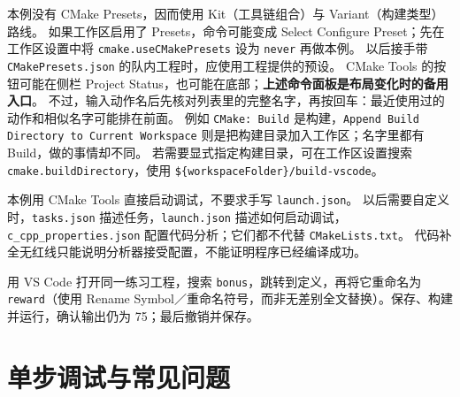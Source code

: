 本例没有 CMake Presets，因而使用 Kit（工具链组合）与 Variant（构建类型）路线。
如果工作区启用了 Presets，命令可能变成 Select Configure Preset；先在工作区设置中将 \texttt{cmake.useCMakePresets} 设为 \texttt{never} 再做本例。
以后接手带 \texttt{CMakePresets.json} 的队内工程时，应使用工程提供的预设。
CMake Tools 的按钮可能在侧栏 Project Status，也可能在底部；\textbf{上述命令面板是布局变化时的备用入口}。
不过，输入动作名后先核对列表里的完整名字，再按回车：最近使用过的动作和相似名字可能排在前面。
例如 \texttt{CMake: Build} 是构建，\texttt{Append Build Directory to Current Workspace} 则是把构建目录加入工作区；名字里都有 Build，做的事情却不同。
若需要显式指定构建目录，可在工作区设置搜索 \texttt{cmake.buildDirectory}，使用 \texttt{\$\{workspaceFolder\}/build-vscode}。

\begin{note}
本例用 CMake Tools 直接启动调试，不要求手写 \texttt{launch.json}。
以后需要自定义时，\texttt{tasks.json} 描述任务，\texttt{launch.json} 描述如何启动调试，\texttt{c\_cpp\_properties.json} 配置代码分析；它们都不代替 \texttt{CMakeLists.txt}。
代码补全无红线只能说明分析器接受配置，不能证明程序已经编译成功。
\end{note}

\begin{exercise}\label{ex:ide-vscode}
用 VS Code 打开同一练习工程，搜索 \texttt{bonus}，跳转到定义，再将它重命名为 \texttt{reward}（使用 Rename Symbol／重命名符号，而非无差别全文替换）。保存、构建并运行，确认输出仍为 75；最后撤销并保存。
\end{exercise}

\section{单步调试与常见问题}
\label{sec:ide-debug}
